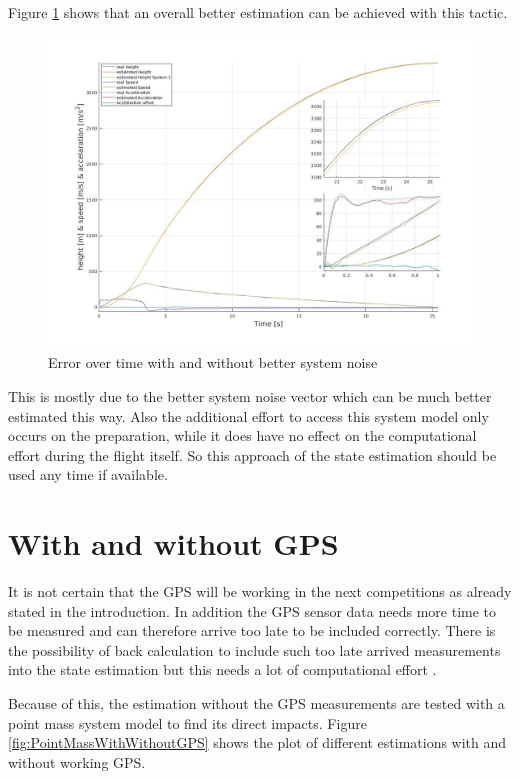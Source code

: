 Figure \ref{fig:PointMassVSBetterNoise} shows that an overall better estimation can be achieved with this tactic.
\begin{figure}[h!]
 \centering
 \includegraphics[width=.8\textwidth]{./Pictures/PointMassVSBetterNoise.jpg}
 \caption{Error over time with and without better system noise}
 \label{fig:PointMassVSBetterNoise}
\end{figure}
This is mostly due to the better system noise vector which can be much better estimated this way.
Also the additional effort to access this system model only occurs on the preparation,
while it does have no effect on the computational effort during the flight itself.
So this approach of the state estimation should be used any time if available.

\newpage
\section{With and without GPS}
It is not certain that the GPS will be working in the next competitions as already stated in the introduction.
In addition the GPS sensor data needs more time to be measured and can therefore arrive too late to be included correctly.
There is the possibility of back calculation to include such too late arrived measurements into the state estimation but this needs a lot of computational effort \cite{SimonDan2006Ose:}.

Because of this, the estimation without the GPS measurements are tested with a point mass system model to find its direct impacts.
Figure \ref{fig:PointMassWithWithoutGPS} shows the plot of different estimations with and without working GPS.

